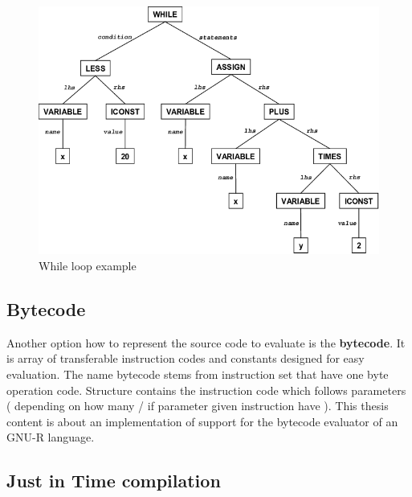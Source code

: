 \documentclass[thesis=M,english]{FITthesis}[2018/10/20]
\begin{document}
\begin{figure}\centering
	\includegraphics{Abstract-syntax-tree-of-the-while-loop}
	\caption{While loop example}\label{fig:ast-while}
\end{figure}

\subsection{Bytecode}\label{BC}

Another option how to represent the source code to evaluate is the \textbf{bytecode}. It is array of transferable instruction codes and constants designed for easy evaluation. The name bytecode stems from instruction set that have one byte operation code. Structure contains the instruction code which follows parameters ( depending on how many / if parameter given instruction have ). This thesis content is about an implementation of support for the bytecode evaluator of an GNU-R language.

\subsection{Just in Time compilation}\label{JIT}
\end{document}
